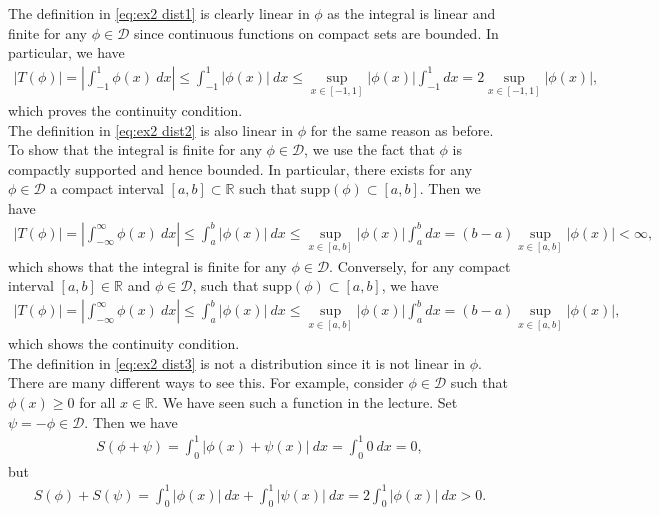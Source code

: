 \documentclass[11pt]{article}
\begin{document}
\begin{solution}
    The definition in \eqref{eq:ex2 dist1} is clearly linear in $\phi$ as the integral is linear
     and finite for any $\phi \in \mathcal{D}$ since continuous functions on compact sets are bounded. In particular, we have
     \begin{align}
            |T(\phi)| = \left| \int_{-1}^{1} \phi(x) \ dx \right| \leq \int_{-1}^{1} |\phi(x)| \ dx \leq \sup_{x \in [-1,1]} |\phi(x)| \int_{-1}^{1} dx = 2 \sup_{x \in [-1,1]} |\phi(x)|,
     \end{align}
     which proves the continuity condition.\\

    The definition in \eqref{eq:ex2 dist2} is also linear in $\phi$ for the same reason as before. To show that the integral is finite for any $\phi \in \mathcal{D}$, we use the fact that $\phi$ is compactly supported and hence bounded.
     In particular, there exists for any $\phi \in \mathcal{D}$ a compact interval $[a, b] \subset \mathbb{R}$ such that $\mathrm{supp}(\phi) \subset [a, b]$. Then we have
    \begin{align}
        |T(\phi)| = \left| \int_{-\infty}^{\infty} \phi(x) \ dx \right| \leq \int_{a}^{b} |\phi(x)| \ dx \leq \sup_{x \in [a,b]} |\phi(x)| \int_{a}^{b} dx = (b-a) \sup_{x \in [a,b]} |\phi(x)| < \infty,
    \end{align}
    which shows that the integral is finite for any $\phi \in \mathcal D$. Conversely, for any compact interval $[a, b] \in \mathbb{R}$ and $\phi \in \mathcal{D}$, such that $\mathrm{supp}(\phi) \subset [a, b]$, we have
    \begin{align}
        |T(\phi)| = \left| \int_{-\infty}^{\infty} \phi(x) \ dx \right| \leq \int_{a}^{b} |\phi(x)| \ dx \leq \sup_{x \in [a,b]} |\phi(x)| \int_{a}^{b} dx = (b-a) \sup_{x \in [a,b]} |\phi(x)|,
    \end{align}
    which shows the continuity condition.
    \\

    The definition in \eqref{eq:ex2 dist3} is not a distribution since it is not linear in $\phi$. 
    There are many different ways to see this. 
    For example, consider $\phi \in \mathcal{D}$ such that $\phi(x) \geq 0$ for all $x \in \mathbb{R}$. 
    We have seen such a function in the lecture. 
    Set $\psi = -\phi \in \mathcal D$. Then we have
    \begin{align}
        S(\phi + \psi) = \int_0^1 |\phi(x) + \psi(x)| \ dx = \int_0^1 0 \ dx = 0,
    \end{align}
    but
    \begin{align}
        S(\phi) + S(\psi) = \int_0^1 |\phi(x)| \ dx + \int_0^1 |\psi(x)| \ dx = 2 \int_0^1 |\phi(x)| \ dx > 0.
    \end{align}
\end{solution}
\end{document}
